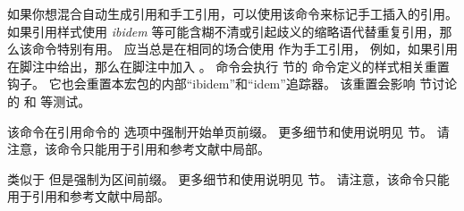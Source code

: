 \begin{ltxsyntax}


如果你想混合自动生成引用和手工引用，可以使用该命令来标记手工插入的引用。
如果引用样式使用 \emph{ibidem} 等可能含糊不清或引起歧义的缩略语代替重复引用，那么该命令特别有用。
应当总是在相同的场合使用  作为手工引用，
例如，如果引用在脚注中给出，那么在脚注中加入 。
 命令会执行  节的  命令定义的样式相关重置钩子。
它也会重置本宏包的内部“ibidem”和“idem”追踪器。
该重置会影响  节讨论的  和  等测试。



该命令在引用命令的  选项中强制开始单页前缀。
更多细节和使用说明见  节。
请注意，该命令只能用于引用和参考文献中局部。



类似于  但是强制为区间前缀。
更多细节和使用说明见  节。
请注意，该命令只能用于引用和参考文献中局部。




\end{ltxsyntax}
